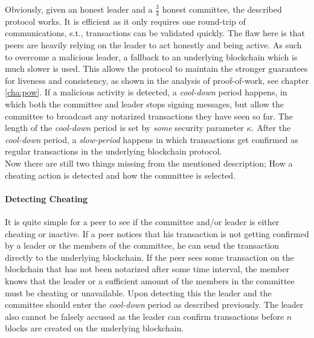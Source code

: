 Obviously, given an honest leader and a $\frac{3}{4}$ honest committee, the described protocol works. It is efficient as it only requires one round-trip of communications, s.t., transactions can be validated quickly. The flaw here is that peers are heavily relying on the leader to act honestly and being active. As such to overcome a malicious leader, a fallback to an underlying blockchain which is much slower is used. This allows the protocol to maintain the stronger guarantees for liveness and consistency, as shown in the analysis of proof-of-work, see chapter \ref{cha:pow}. If a malicious activity is detected, a \emph{cool-down} period happens, in which both the committee and leader stops signing messages, but allow the committee to broadcast any notarized transactions they have seen so far. The length of the \emph{cool-down} period is set by \emph{some} security parameter $\kappa$. After the \emph{cool-down} period, a \emph{slow-period} happens in which transactions get confirmed as regular transactions in the underlying blockchain protocol.\\

Now there are still two things missing from the mentioned description; How a cheating action is detected and how the committee is selected.

\paragraph{Detecting Cheating} It is quite simple for a peer to see if the committee and/or leader is either cheating or inactive. If a peer notices that his transaction is not getting confirmed by a leader or the members of the committee, he can send the transaction directly to the underlying blockchain. If the peer sees some transaction on the blockchain that has not been notarized after some time interval, the member knows that the leader or a sufficient amount of the members in the committee must be cheating or unavailable. Upon detecting this the leader and the committee should enter the \emph{cool-down} period as described previously. The leader also cannot be falsely accused as the leader can confirm transactions before $n$ blocks are created on the underlying blockchain.


